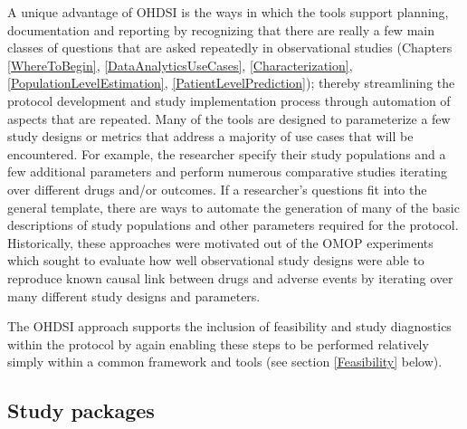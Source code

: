 \documentclass[11pt]{book}
\theoremstyle{definition}
\theoremstyle{definition}
\theoremstyle{definition}
\theoremstyle{remark}
\begin{document}
A unique advantage of OHDSI is the ways in which the tools support planning, documentation and reporting by recognizing that there are really a few main classes of questions that are asked repeatedly in observational studies (Chapters \ref{WhereToBegin}, \ref{DataAnalyticsUseCases}, \ref{Characterization}, \ref{PopulationLevelEstimation}, \ref{PatientLevelPrediction}); thereby streamlining the protocol development and study implementation process through automation of aspects that are repeated.
Many of the tools are designed to parameterize a few study designs or metrics that address a majority of use cases that will be encountered. For example, the researcher specify their study populations and a few additional parameters and perform numerous comparative studies iterating over different drugs and/or outcomes. If a researcher's questions fit into the general template, there are ways to automate the generation of many of the basic descriptions of study populations and other parameters required for the protocol. Historically, these approaches were motivated out of the OMOP experiments which sought to evaluate how well observational study designs were able to reproduce known causal link between drugs and adverse events by iterating over many different study designs and parameters.

The OHDSI approach supports the inclusion of feasibility and study diagnostics within the protocol by again enabling these steps to be performed relatively simply within a common framework and tools (see section \ref{Feasibility} below).

\hypertarget{study-packages}{%
\subsection{Study packages}\label{study-packages}}
\end{document}
